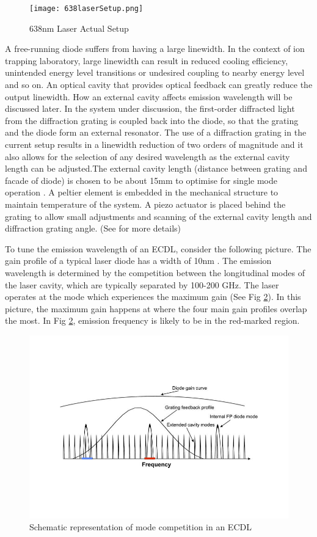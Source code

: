 \documentclass[12pt]{report}
\begin{document}
\begin{figure}[H]
    \centering
    \texttt{[image: 638laserSetup.png]}
    \caption{638nm Laser Actual Setup}
    \label{fig:638laserSetup}
\end{figure}

A free-running diode suffers from having a large linewidth. In the context of ion trapping laboratory, large linewidth can result in reduced cooling efficiency, unintended energy level transitions or undesired coupling to nearby energy level and so on. An optical cavity that provides optical feedback can greatly reduce the output linewidth. How an external cavity affects emission wavelength will be discussed later. In the system under discussion, the first-order diffracted light from the diffraction grating is coupled back into the diode, so that the grating and the diode form an external resonator. The use of a diffraction grating in the current setup results in a linewidth reduction of two orders of magnitude and it also allows for the selection of any desired wavelength as the external cavity length can be adjusted\cite{compactGratingDiodeLaser}.The external cavity length (distance between grating and facade of diode) is chosen to be about 15mm to optimise for single mode operation \cite{compactGratingDiodeLaser}. A peltier element is embedded in the mechanical structure to maintain temperature of the system. A piezo actuator is placed behind the grating to allow small adjustments and scanning of the external cavity length and diffraction grating angle. (See \cite{compactGratingDiodeLaser} for more details)
\par
To tune the emission wavelength of an ECDL, consider the following picture. The gain profile of a typical laser diode has a width of 10nm \cite{compactGratingDiodeLaser}. The emission wavelength is determined by the competition between the longitudinal modes of the laser cavity, which are typically separated by 100-200 GHz\cite{compactGratingDiodeLaser}. The laser operates at the mode which experiences the maximum gain (See Fig \ref{fig:diodeLaserGainCurve}). In this picture, the maximum gain happens at where the four main gain profiles overlap the most. In Fig \ref{fig:diodeLaserGainCurve}, emission frequency is likely to be in the red-marked region. 
\begin{figure}[H]
    \centering
    \includegraphics[width=.8\textwidth]{diodeLaserGainCurve.png}
    \caption{Schematic representation of mode competition in an ECDL\cite{DiodeLaserInducedFluorescenceForGas-PhaseDiagnostics}}
    \label{fig:diodeLaserGainCurve}
\end{figure}
\end{document}
